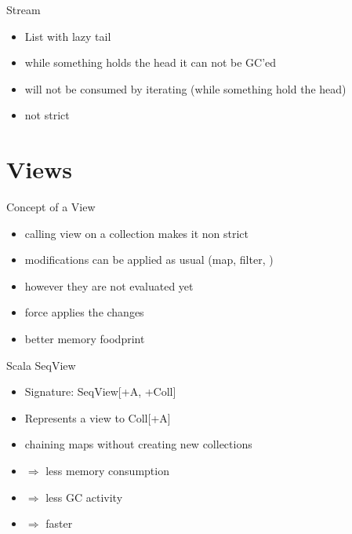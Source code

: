 \documentclass[xcolor=svgnames]{beamer}
\begin{document}
    \begin{frame}
    {Stream}
        \begin{itemize}
            \item List with lazy tail
            \item while something holds the head it can not be GC'ed
            \item will not be consumed by iterating (while something hold the head)
            \item not strict
        \end{itemize}
    \end{frame}

    \section{Views}

    \begin{frame}[fragile]
    {Concept of a View}
        \begin{itemize}
            \item calling view on a collection makes it non strict
            \item modifications can be applied as usual (map, filter, \textellipsis)
            \item however they are not evaluated yet \pause
            \item force applies the changes
            \item better memory foodprint
        \end{itemize}
    \end{frame}

    \begin{frame}[fragile]
    {Scala SeqView}
        \begin{itemize}
            \item Signature: SeqView[+A, +Coll]
            \item Represents a view to Coll[+A]
            \item chaining maps without creating new collections
            \item $\Rightarrow$ less memory consumption \pause
            \item $\Rightarrow$ less GC activity \pause
            \item $\Rightarrow$ faster
        \end{itemize}
    \end{frame}
\end{document}
